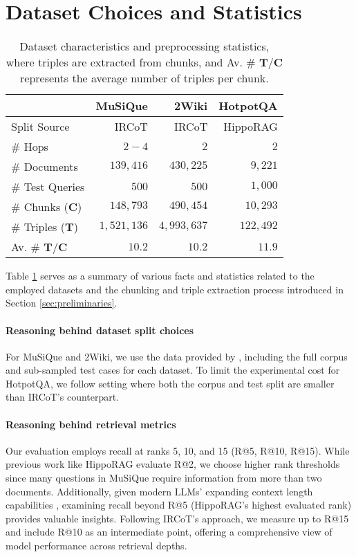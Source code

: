 \section{Dataset Choices and Statistics}
\label{appendix:dataset_stats}

\begin{table}[ht]
\centering
\small
\begin{tabular}{@{}lrrr@{}}
\toprule
& \textbf{MuSiQue} & \textbf{2Wiki} & \textbf{HotpotQA} \\ \midrule
Split Source & IRCoT & IRCoT & HippoRAG \\ \midrule
\# Hops  & $2-4$ & $2$ & $2$ \\
\# Documents & $139,416$ & $430,225$ & $9,221$ \\
\# Test Queries & $500$ & $500$ & $1,000$\\ \midrule
\# Chunks ($\mathbf{C}$) & $148,793$  & $490,454$ & $10,293$ \\
\# Triples ($\mathbf{T}$) & $1,521,136$  & $4,993,637$ & $122,492$ \\
Av. \# $\mathbf{T}/\mathbf{C}$ & $10.2$  & $10.2$ & $11.9$ \\
\bottomrule
\end{tabular}
\caption{Dataset characteristics and preprocessing statistics, where triples are extracted from chunks, and Av. \# $\mathbf{T}$$/$$\mathbf{C}$ represents the average number of triples per chunk.}
\label{tab:dataset statistics}
\end{table}

Table \ref{tab:dataset statistics} serves as a summary of various facts and statistics related to the employed datasets and the chunking and triple extraction process introduced in Section \ref{sec:preliminaries}.


\paragraph{Reasoning behind dataset split choices}
For MuSiQue and 2Wiki, we use the data provided by \citeauthor{Trivedi2023}, including the full corpus and sub-sampled test cases for each dataset. To limit the experimental cost for HotpotQA, we follow \citeauthor{Gutierrez2024} setting where both the corpus and test split are smaller than IRCoT's counterpart.

\paragraph{Reasoning behind retrieval metrics}
\label{appendix:reasoning_behind_retrieval_metrics}
Our evaluation employs recall at ranks 5, 10, and 15 (R@5, R@10, R@15). While previous work like HippoRAG evaluate R@2, we choose higher rank thresholds since many questions in MuSiQue require information from more than two documents. Additionally, given modern LLMs' expanding context length capabilities \cite{Ding2024}, examining recall beyond R@5 (HippoRAG's highest evaluated rank) provides valuable insights. Following IRCoT's approach, we measure up to R@15 and include R@10 as an intermediate point, offering a comprehensive view of model performance across retrieval depths.
